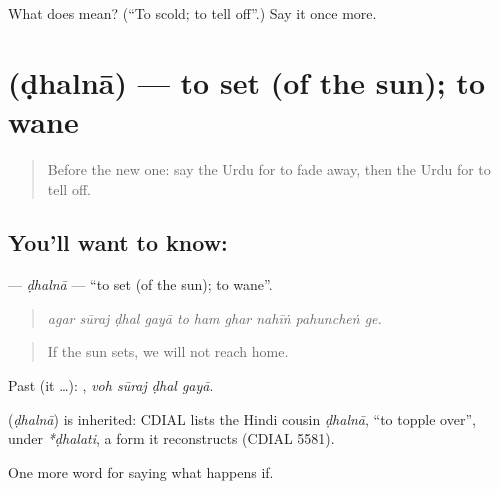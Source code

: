 \begin{tcolorbox}[breakable,colback=teal!4,colframe=teal!35!black,title={Before you move on}]
What does  mean? (\textquotedblleft{}To scold; to tell off\textquotedblright{}.) Say it once more.
\end{tcolorbox}
\section[\texorpdfstring{\ur{ڈھلنا} (ḍhalnā)}{ڈھلنا (ḍhalnā)}]{ (ḍhalnā) — to set (of the sun); to wane}

\label{lesson:UR-C373-dhalna}



\begin{quote}
Before the new one: say the Urdu for to fade away, then the Urdu for to tell off.
\end{quote}

\subsection*{You'll want to know: }
\textbf{} — \emph{ḍhalnā} — \textquotedblleft{}to set (of the sun); to wane\textquotedblright{}.

\begin{quote}
         
\end{quote}

\begin{quote}
\emph{agar sūraj ḍhal gayā to ham ghar nahīṅ pahuncheṅ ge.}
\end{quote}

\begin{quote}
If the sun sets, we will not reach home.
\end{quote}

Past (it …):    , \emph{voh sūraj ḍhal gayā}.

\begin{cousinweb}
\textbf{} (\emph{ḍhalnā}) is inherited: CDIAL lists the Hindi cousin \emph{ḍhalnā}, \textquotedblleft{}to topple over\textquotedblright{}, under \emph{*ḍhalati}, a form it reconstructs (CDIAL 5581).
\end{cousinweb}

\begin{grammarlens}[title={What you've built}]
One more word for saying what happens if.
\end{grammarlens}

